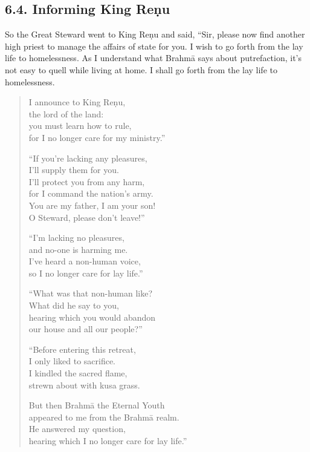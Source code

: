 \documentclass[12pt,openany]{book}%
\begin{document}
\subsection*{6.4. Informing King \textsanskrit{Reṇu} }

So the Great Steward went to King \textsanskrit{Reṇu} and said, “Sir, please now find another high priest to manage the affairs of state for you. I wish to go forth from the lay life to homelessness. As I understand what \textsanskrit{Brahmā} says about putrefaction, it’s not easy to quell while living at home. I shall go forth from the lay life to homelessness. 

\begin{verse}%
I announce to King \textsanskrit{Reṇu}, \\
the lord of the land: \\
you must learn how to rule, \\
for I no longer care for my ministry.” 

“If you’re lacking any pleasures, \\
I’ll supply them for you. \\
I’ll protect you from any harm, \\
for I command the nation’s army. \\
You are my father, I am your son! \\
O Steward, please don’t leave!” 

“I’m lacking no pleasures, \\
and no-one is harming me. \\
I’ve heard a non-human voice, \\
so I no longer care for lay life.” 

“What was that non-human like? \\
What did he say to you, \\
hearing which you would abandon \\
our house and all our people?” 

“Before entering this retreat, \\
I only liked to sacrifice. \\
I kindled the sacred flame, \\
strewn about with kusa grass. 

But then \textsanskrit{Brahmā} the Eternal Youth \\
appeared to me from the \textsanskrit{Brahmā} realm. \\
He answered my question, \\
hearing which I no longer care for lay life.” 


\end{verse}
\end{document}
